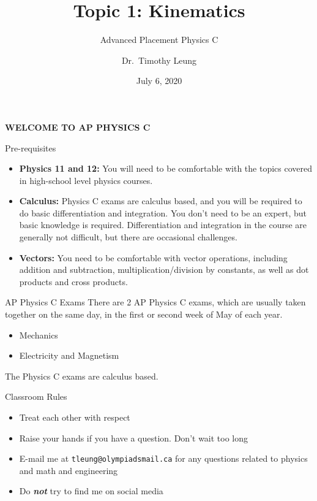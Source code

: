 \documentclass[12pt,compress,aspectratio=169]{beamer}
\title{Topic 1: Kinematics}
\subtitle{Advanced Placement Physics C}
\author[TML]{Dr.\ Timothy Leung}
\institute{Olympiads School}
\date{July 6, 2020}
\begin{document}
\begin{frame}{}

  {\LARGE
    \begin{center}
      \textbf{WELCOME TO AP PHYSICS C}
    \end{center}
  }
\end{frame}



\begin{frame}{Pre-requisites}
  \begin{itemize}
  \item\textbf{Physics 11 and 12:} You will need to be comfortable with the
    topics covered in high-school level physics courses.
  \item\textbf{Calculus:} Physics C exams are calculus based, and you will be
    required to do basic differentiation and integration. You don't need to be
    an expert, but basic knowledge is required. Differentiation and integration
    in the course are generally not difficult, but there are occasional
    challenges.
  \item\textbf{Vectors:} You need to be comfortable with vector operations,
    including addition and subtraction, multiplication/division by constants,
    as well as dot products and cross products.
  \end{itemize}
\end{frame}



\begin{frame}{AP Physics C Exams}
  There are 2 AP Physics C exams, which are usually taken together on the same
  day, in the first or second week of May of each year.
  \begin{itemize}
  \item Mechanics
  \item Electricity and Magnetism
  \end{itemize}
  The Physics C exams are calculus based.
\end{frame}



\begin{frame}{Classroom Rules}
  \begin{itemize}
  \item Treat each other with respect
  \item Raise your hands if you have a question. Don't wait too long
  \item E-mail me at \texttt{tleung@olympiadsmail.ca} for any questions related
    to physics and math and engineering
  \item Do \textbf{\emph{not}} try to find me on social media
  \end{itemize}
\end{frame}
\end{document}
